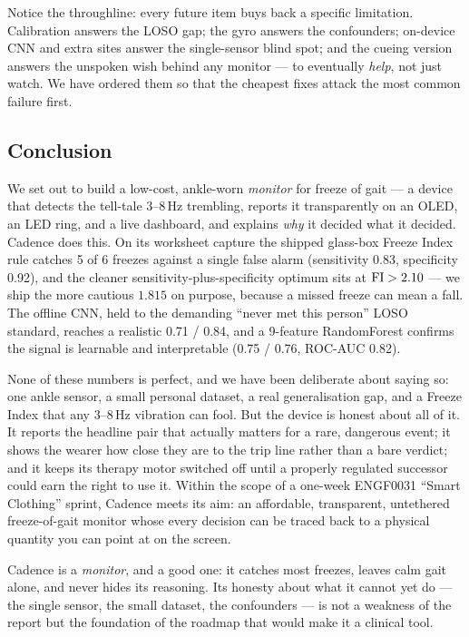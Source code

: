 \begin{intuition}
Notice the throughline: every future item buys back a specific limitation. Calibration
answers the LOSO gap; the gyro answers the confounders; on-device CNN and extra sites
answer the single-sensor blind spot; and the cueing version answers the unspoken wish
behind any monitor --- to eventually \emph{help}, not just watch. We have ordered them
so that the cheapest fixes attack the most common failure first.
\end{intuition}

\subsection{Conclusion}

We set out to build a low-cost, ankle-worn \emph{monitor} for freeze of gait --- a
device that detects the tell-tale 3--8\,Hz trembling, reports it transparently on an
OLED, an LED ring, and a live dashboard, and explains \emph{why} it decided what it
decided. Cadence does this. On its worksheet capture the shipped glass-box Freeze Index
rule catches 5 of 6 freezes against a single false alarm (sensitivity 0.83, specificity
0.92), and the cleaner sensitivity-plus-specificity optimum sits at $\mathrm{FI}>2.10$ --- we
ship the more cautious $1.815$ on purpose, because a missed freeze can mean a fall. The
offline CNN, held to the demanding ``never met this person'' LOSO standard, reaches a
realistic 0.71 / 0.84, and a 9-feature RandomForest confirms the signal is learnable
and interpretable (0.75 / 0.76, ROC-AUC 0.82).

None of these numbers is perfect, and we have been deliberate about saying so: one
ankle sensor, a small personal dataset, a real generalisation gap, and a Freeze Index
that any 3--8\,Hz vibration can fool. But the device is honest about all of it. It
reports the headline pair that actually matters for a rare, dangerous event; it shows
the wearer how close they are to the trip line rather than a bare verdict; and it keeps
its therapy motor switched off until a properly regulated successor could earn the right
to use it. Within the scope of a one-week ENGF0031 ``Smart Clothing'' sprint, Cadence
meets its aim: an affordable, transparent, untethered freeze-of-gait monitor whose every
decision can be traced back to a physical quantity you can point at on the screen.

\begin{takeaway}
Cadence is a \emph{monitor}, and a good one: it catches most freezes, leaves calm gait
alone, and never hides its reasoning. Its honesty about what it cannot yet do --- the
single sensor, the small dataset, the confounders --- is not a weakness of the report
but the foundation of the roadmap that would make it a clinical tool.
\end{takeaway}

